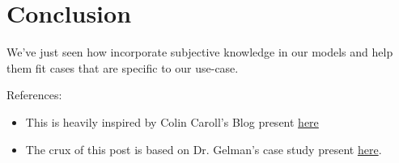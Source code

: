 \documentclass[11pt]{article}
\makeatletter
\providecommand{\tightlist}{%
      \setlength{\itemsep}{0pt}\setlength{\parskip}{0pt}}
\newcommand{\boxspacing}{\kern\kvtcb@left@rule\kern\kvtcb@boxsep}
\newcommand{\prompt}[4]{
        \ttfamily\llap{{\color{#2}[#3]:\hspace{3pt}#4}}\vspace{-\baselineskip}
    }
\makeatother
\begin{document}
    \section{Conclusion}\label{conclusion}

    We've just seen how incorporate subjective knowledge in our models and
help them fit cases that are specific to our use-case.

References:

\begin{itemize}
\tightlist
\item
  This is heavily inspired by Colin Caroll's Blog present
  \href{https://nbviewer.jupyter.org/github/pymc-devs/pymc3/blob/master/docs/source/notebooks/putting_workflow.ipynb}{here}
\item
  The crux of this post is based on Dr. Gelman's case study present
  \href{https://mc-stan.org/users/documentation/case-studies/golf.html}{here}.
\end{itemize}

    \begin{tcolorbox}[breakable, size=fbox, boxrule=1pt, pad at break*=1mm,colback=cellbackground, colframe=cellborder]
\prompt{In}{incolor}{ }{\boxspacing}
\begin{Verbatim}[commandchars=\\\{\}]

\end{Verbatim}
\end{tcolorbox}


    
    
    
\end{document}
